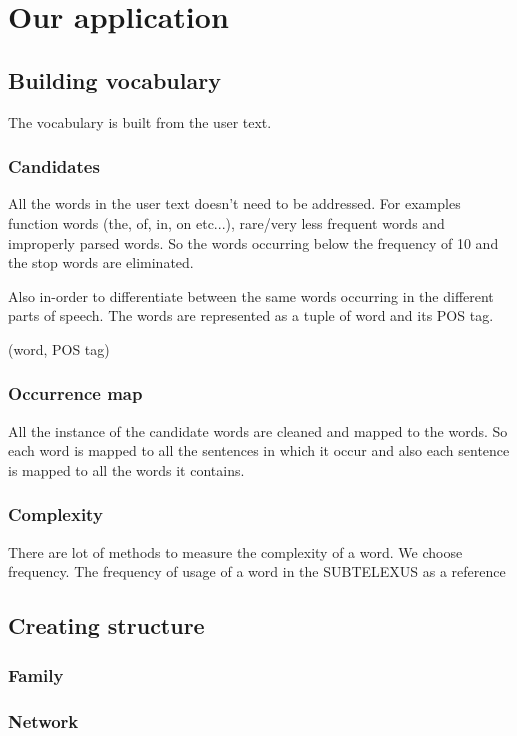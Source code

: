 \documentclass[11pt,a4paper]{article}
\begin{document}
\section{Our application}

\subsection{Building vocabulary}
The vocabulary is built from the user text.

\subsubsection{Candidates}
All the words in the user text doesn't need to be addressed. For examples 
function words (the, of, in, on etc...), rare/very less frequent words and
improperly parsed words. So the words occurring below the frequency of 10 and
the stop words are eliminated. 

Also in-order to differentiate between the same words occurring in the
different parts of speech. The words are represented as a tuple of word and its
POS tag.
\begin{center}(word, POS tag)\end{center}

\subsubsection{Occurrence map}
All the instance of the candidate words are cleaned and mapped to the words.
So each word is mapped to all the sentences in which it occur and also each
sentence is mapped to all the words it contains.

\subsubsection{Complexity}
There are lot of methods to measure the complexity of a word. We choose frequency.
The frequency of usage of a word in the SUBTELEXUS as a reference

\subsection{Creating structure}

\subsubsection{Family}

\subsubsection{Network}
\end{document}
